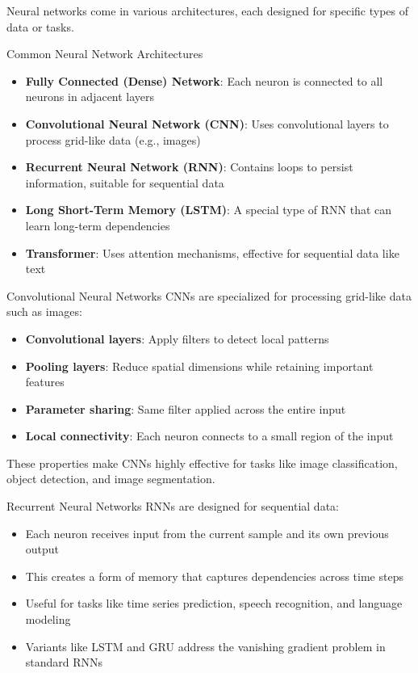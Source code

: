 Neural networks come in various architectures, each designed for specific types of data or tasks.

\begin{definition}{Common Neural Network Architectures}
\begin{itemize}
    \item \textbf{Fully Connected (Dense) Network}: Each neuron is connected to all neurons in adjacent layers
    \item \textbf{Convolutional Neural Network (CNN)}: Uses convolutional layers to process grid-like data (e.g., images)
    \item \textbf{Recurrent Neural Network (RNN)}: Contains loops to persist information, suitable for sequential data
    \item \textbf{Long Short-Term Memory (LSTM)}: A special type of RNN that can learn long-term dependencies
    \item \textbf{Transformer}: Uses attention mechanisms, effective for sequential data like text
\end{itemize}
\end{definition}

\begin{concept}{Convolutional Neural Networks}
CNNs are specialized for processing grid-like data such as images:
\begin{itemize}
    \item \textbf{Convolutional layers}: Apply filters to detect local patterns
    \item \textbf{Pooling layers}: Reduce spatial dimensions while retaining important features
    \item \textbf{Parameter sharing}: Same filter applied across the entire input
    \item \textbf{Local connectivity}: Each neuron connects to a small region of the input
\end{itemize}
These properties make CNNs highly effective for tasks like image classification, object detection, and image segmentation.
\end{concept}

\begin{concept}{Recurrent Neural Networks}
RNNs are designed for sequential data:
\begin{itemize}
    \item Each neuron receives input from the current sample and its own previous output
    \item This creates a form of memory that captures dependencies across time steps
    \item Useful for tasks like time series prediction, speech recognition, and language modeling
    \item Variants like LSTM and GRU address the vanishing gradient problem in standard RNNs
\end{itemize}
\end{concept}

